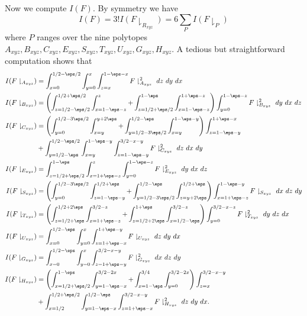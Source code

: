 Now we compute $I(F)$.  By symmetry we have
$$ I(F) = 3! I(F \downharpoonright_{R_{xyz}} ) = 6 \sum_P I( F \downharpoonright_P ) $$
where $P$ ranges over the nine polytopes $A_{xyz}, B_{xyz}, C_{xyz}, E_{xyz}, S_{xyz}, T_{xyz}, U_{xyz}, G_{xyz}, H_{xyz}$.  A tedious but straightforward computation shows that
\begin{align*}
I(F\downharpoonright_{A_{xyz}}) & =\int_{x=0}^{1/2-\eps/2}\int_{y=0}^{x}\int_{z=x}^{1-\eps-x}F\downharpoonright_{A_{xyz}}^2\ dz\ dy\ dx \\
I(F\downharpoonright_{B_{xyz}}) &= \left(\int_{z=1/2-\eps/2}^{1/2+\eps/2}\int_{x=1-\eps-z}^{z} +\int_{z=1/2+\eps/2}^{1-\eps}\int_{x=1-\eps-z}^{1+\eps-z}\right) \int_{y=0}^{1-\eps-z}F\downharpoonright_{B_{xyz}}^2\ dy\ dx\ dz \\
I(F\downharpoonright_{C_{xyz}}) & = \left(\int_{y=0}^{1/2-3\eps/2} \int_{x=y}^{y+2\eps} + \int_{y=1/2-3\eps/2}^{1/2-\eps}\int_{x=y}^{1-\eps-y} \right) \int_{z=1-\eps-y}^{1+\eps-x} \\ & + \int_{y=1/2-\eps}^{1/2-\eps/2}\int_{x=y}^{1-\eps-y}\int_{z=1-\eps-y}^{3/2-x-y} F\downharpoonright_{C_{xyz}}^2\ dz\ dx\ dy \\
I(F\downharpoonright_{E_{xyz}}) & = \int_{z=1/2+\eps/2}^{1-\eps}\int_{x=1+\eps-z}^{z}\int_{y=0}^{1-\eps-z} F\downharpoonright_{E_{xyz}}^2\ dy\ dx\ dz \\
I(F\downharpoonright_{S_{xyz}}) & =  \left(\int_{y=0}^{1/2-3\eps/2}\int_{z=1-\eps-y}^{1/2+\eps} +\int_{y=1/2-3\eps/2}^{1/2-\eps}\int_{z=y+2\eps}^{1/2+\eps} \right)\int_{x=1+\eps-z}^{1-\eps-y} F\downharpoonright_{S_{xyz}}\ dx\ dz\ dy \\
I(F\downharpoonright_{T_{xyz}}) &  = \left(\int_{z=1/2+\eps}^{1/2+2\eps}\int_{x=1+\eps-z}^{3/2-z} + \int_{z=1/2+2\eps}^{1+\eps}\int_{x=1/2-\eps}^{3/2-z}\right)\int_{y=0}^{3/2-x-z} F\downharpoonright_{T_{xyz}}^2\ dy\ dz\ dx \\
I(F\downharpoonright_{U_{xyz}}) & = \int_{x=0}^{1/2-\eps}\int_{y=0}^{x}\int_{z=1+\eps-x}^{1+\eps-y} F\downharpoonright_{U_{xyz}}\ dz\ dy\ dx\\
I(F\downharpoonright_{G_{xyz}}) & = \int_{x=0}^{1/2-\eps}\int_{y=0}^{x}\int_{z=1+\eps-y}^{3/2-x-y} F\downharpoonright_{G_{xyz}}^2\ dx\ dz\ dy\\
I(F\downharpoonright_{H_{xyz}}) & =\left(\int_{x=1/2+\eps/2}^{1-\eps}\int_{y=1-\eps-x}^{3/2-2x} +\int_{x=1-\eps}^{3/4}\int_{y=0}^{3/2-2x} \right) \int_{z=x}^{3/2-x-y}\\ & + \int_{x=1/2}^{1/2+\eps/2}\int_{y=1-\eps-x}^{1/2-\eps}\int_{z=1+\eps-x}^{3/2-x-y} F\downharpoonright_{H_{xyz}}^2\ dz\ dy\ dx.
\end{align*}

